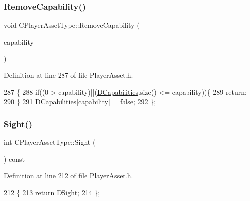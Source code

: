 \subsubsection{\texorpdfstring{Remove\+Capability()}{RemoveCapability()}}
{\footnotesize\ttfamily void C\+Player\+Asset\+Type\+::\+Remove\+Capability (\begin{DoxyParamCaption}\item[{\hyperlink{GameDataTypes_8h_a35b98ce26aca678b03c6f9f76e4778ce}{E\+Asset\+Capability\+Type}}]{capability }\end{DoxyParamCaption})\hspace{0.3cm}{\ttfamily [inline]}}



Definition at line 287 of file Player\+Asset.\+h.


\begin{DoxyCode}
287                                                               \{
288             \textcolor{keywordflow}{if}((0 > capability)||(\hyperlink{classCPlayerAssetType_a243f9161c56446b378dc42b51977fc58}{DCapabilities}.size() <= capability))\{
289                 \textcolor{keywordflow}{return};
290             \}
291             \hyperlink{classCPlayerAssetType_a243f9161c56446b378dc42b51977fc58}{DCapabilities}[capability] = \textcolor{keyword}{false};
292         \};
\end{DoxyCode}
\hypertarget{classCPlayerAssetType_aaa744aa1d6c284f91e46dfc7c04bef88}{}\label{classCPlayerAssetType_aaa744aa1d6c284f91e46dfc7c04bef88} 
\subsubsection{\texorpdfstring{Sight()}{Sight()}}
{\footnotesize\ttfamily int C\+Player\+Asset\+Type\+::\+Sight (\begin{DoxyParamCaption}{ }\end{DoxyParamCaption}) const\hspace{0.3cm}{\ttfamily [inline]}}



Definition at line 212 of file Player\+Asset.\+h.


\begin{DoxyCode}
212                          \{
213             \textcolor{keywordflow}{return} \hyperlink{classCPlayerAssetType_afa32c3f45737443299a4e681dfe64911}{DSight};  
214         \};
\end{DoxyCode}
\hypertarget{classCPlayerAssetType_ac8789fc617ebd7b64f95bb1c1d95174d}{}\label{classCPlayerAssetType_ac8789fc617ebd7b64f95bb1c1d95174d} 
